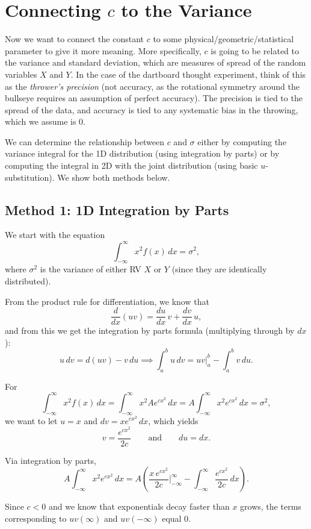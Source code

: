\documentclass[12pt]{article}
\begin{document}
\section*{Connecting $c$ to the Variance}
 
Now we want to connect the constant $c$ to some physical/geometric/statistical parameter to give it more meaning. More specifically, $c$ is going to be related to the variance and standard deviation, which are measures of spread of the random variables $X$ and $Y$. In the case of the dartboard thought experiment, think of this as the \emph{thrower's precision} (not accuracy, as the rotational symmetry around the bullseye requires an assumption of perfect accuracy). The precision is tied to the spread of the data, and accuracy is tied to any systematic bias in the throwing, which we assume is $0$.
 
We can determine the relationship between $c$ and $\sigma$ either by computing the variance integral for the 1D distribution (using integration by parts) or by computing the integral in 2D with the joint distribution (using basic $u$-substitution). We show both methods below.
 
\subsection*{Method 1: 1D Integration by Parts}
 
We start with the equation
\[
    \int_{-\infty}^{\infty} x^2 f(x)\,dx = \sigma^2,
\]
where $\sigma^2$ is the variance of either RV $X$ or $Y$ (since they are identically distributed).
 
From the product rule for differentiation, we know that
\[
    \frac{d}{dx}(uv) = \frac{du}{dx}\,v + \frac{dv}{dx}\,u,
\]
and from this we get the integration by parts formula (multiplying through by $dx$):
\[
    u\,dv = d(uv) - v\,du \implies \int_a^b u\,dv = uv\Big|_a^b - \int_a^b v\,du.
\]
 
For
\[
    \int_{-\infty}^{\infty} x^2 f(x)\,dx
    = \int_{-\infty}^{\infty} x^2 A e^{cx^2}\,dx
    = A\int_{-\infty}^{\infty} x^2 e^{cx^2}\,dx = \sigma^2,
\]
we want to let $u = x$ and $dv = x e^{cx^2}\,dx$, which yields
\[
    v = \frac{e^{cx^2}}{2c} \qquad \text{and} \qquad du = dx.
\]
 
Via integration by parts,
\[
    A\int_{-\infty}^{\infty} x^2 e^{cx^2}\,dx
    = A\!\left(\frac{x\,e^{cx^2}}{2c}\Big|_{-\infty}^{\infty} - \int_{-\infty}^{\infty} \frac{e^{cx^2}}{2c}\,dx\right).
\]
 
Since $c < 0$ and we know that exponentials decay faster than $x$ grows, the terms corresponding to $uv(\infty)$ and $uv(-\infty)$ equal $0$.
 
\end{document}
